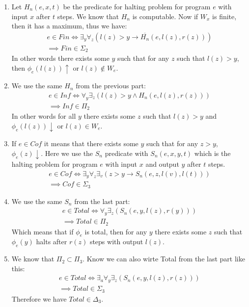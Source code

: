 \begin{enumerate}[label=\ilabel]
    \item
        Let $H_n(e, x, t)$ be the predicate for halting problem for program $e$ with input $x$ after $t$ steps. We know that $H_n$ is computable. Now if $W_x$ is finite, then it has a maximum, thus we have:
        \begin{gather*}
            e \in Fin \iff \exists_y \forall_z (l(z) > y \rightarrow \overline{H_n}(e, l(z), r(z)))\\
            \implies Fin \in \Sigma_2
        \end{gather*}
        In other words there exists some $y$ such that for any $z$ such that $l(z) > y$, then $\phi_e(l(z)) \uparrow$ or $l(z) \notin W_e$. 

    \item
        We use the same $H_n$ from the previous part:
        \begin{gather*}
            e \in Inf \iff \forall_y \exists_z (l(z) > y \wedge  H_n(e, l(z), r(z))) \\
            \implies Inf \in \Pi_2
        \end{gather*}
        In other words for all $y$ there exists some $z$ such that $l(z) > y$ and $\phi_e(l(z)) \downarrow$ or $l(z) \in W_e$.

    \item
        If $e \in Cof$ it means that there exists some $y$ such that for any $z > y$, $\phi_e(z) \downarrow$. Here we use the $S_n$ predicate with $S_n(e, x, y, t)$ which is the halting problem for program $e$ with input $x$ and output $y$ after $t$ steps.
        \begin{gather*}
            e \in Cof \iff \exists_y \forall_z \exists_v (z > y \rightarrow S_n(e, z, l(v), l(t))) \\
            \implies Cof \in \Sigma_3
        \end{gather*}

    \item
        We use the same $S_n$ from the last part:
        \begin{gather*}
            e \in Total \iff \forall_y \exists_z (S_n(e, y, l(z), r(y))) \\
            \implies Total \in \Pi_2
        \end{gather*}
        Which means that if $\phi_e$ is total, then for any $y$ there exists some $z$ such that $\phi_e(y)$ halts after $r(z)$ steps with output $l(z)$.

    \item 
        We know that $\Pi_2 \subset \Pi_3$. Know we can also wirte Total from the last part like this:
        \begin{gather*}
            e \in Total \iff \exists_a \forall_y \exists_z (S_n(e, y, l(z), r(z))) \\
            \implies Total \in \Sigma_3 
        \end{gather*}
        Therefore we have $Total \in \Delta_3$.
\end{enumerate}